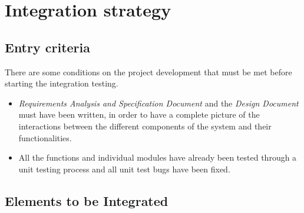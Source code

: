 \pagebreak
\section{Integration strategy}

\subsection{Entry criteria}
There are some conditions on the project development that must be met before starting the integration testing. 

\begin{itemize}
	\item \textit{Requirements Analysis and Specification Document} and the \textit{Design Document} must have been written, in order to have a complete picture of the interactions between the different components of the system and their functionalities.
	\item All the functions and individual modules have already been tested through a unit testing process and all unit test bugs have been fixed.
\end{itemize}


\subsection{Elements to be Integrated}


